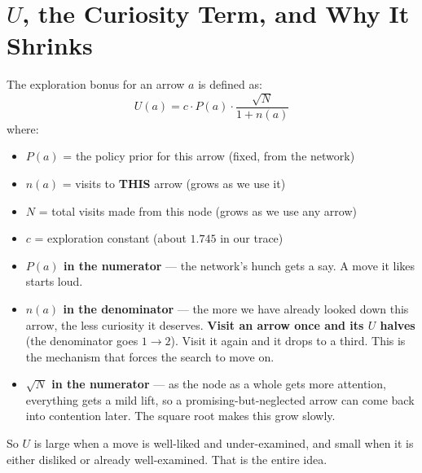 \chapter{$U$, the Curiosity Term, and Why It Shrinks}
\label{ch:u_curiosity}

The exploration bonus for an arrow $a$ is defined as:
\begin{equation}
  U(a) = c \cdot P(a) \cdot \frac{\sqrt{N}}{1 + n(a)}
\end{equation}
where:
\begin{itemize}[leftmargin=2em]
  \item $P(a)$ = the policy prior for this arrow (fixed, from the network)
  \item $n(a)$ = visits to \textbf{THIS} arrow (grows as we use it)
  \item $N$ = total visits made from this node (grows as we use any arrow)
  \item $c$ = exploration constant (about $1.745$ in our trace)
\end{itemize}

\begin{established}
\begin{itemize}[leftmargin=2em]
  \item \textbf{$P(a)$ in the numerator} --- the network's hunch gets a say. A move it likes starts loud.
  \item \textbf{$n(a)$ in the denominator} --- the more we have already looked down this arrow, the less curiosity it deserves. \textbf{Visit an arrow once and its $U$ halves} (the denominator goes $1 \to 2$). Visit it again and it drops to a third. This is the mechanism that forces the search to move on.
  \item \textbf{$\sqrt{N}$ in the numerator} --- as the node as a whole gets more attention, everything gets a mild lift, so a promising-but-neglected arrow can come back into contention later. The square root makes this grow slowly.
\end{itemize}
\end{established}

So $U$ is large when a move is well-liked and under-examined, and small when it is either disliked or already well-examined. That is the entire idea.

\begin{center}
\begin{minipage}{\linewidth}
\centering

\label{fig:ushrink}
\end{minipage}
\end{center}

